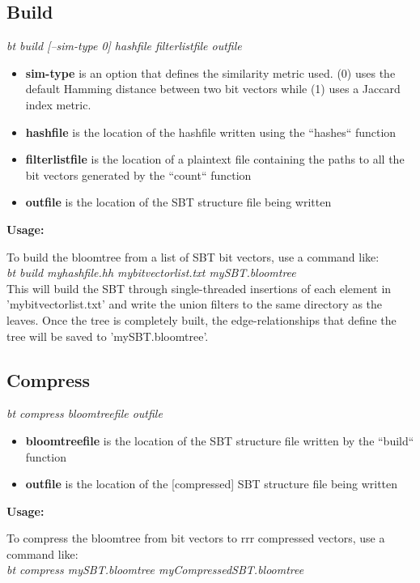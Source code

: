 \documentclass{article}
\begin{document}
\subsection{Build}
\textit{bt build [--sim-type 0] hashfile filterlistfile outfile}
\begin{itemize}
\item \textbf{sim-type} is an option that defines the similarity metric used. (0) uses the default Hamming distance between two bit vectors while (1) uses a Jaccard index metric.
\item \textbf{hashfile} is the location of the hashfile written using the ``hashes`` function
\item \textbf{filterlistfile} is the location of a plaintext file containing the paths to all the bit vectors generated by the ``count`` function
\item \textbf{outfile} is the location of the SBT structure file being written
\end{itemize}
\textbf{Usage:}

To build the bloomtree from a list of SBT bit vectors, use a command like: \\

\textit{bt build myhashfile.hh mybitvectorlist.txt mySBT.bloomtree} \\

This will build the SBT through single-threaded insertions of each element in 'mybitvectorlist.txt' and write the union filters to the same directory as the leaves. Once the tree is completely built, the edge-relationships that define the tree will be saved to 'mySBT.bloomtree'.

\subsection{Compress}
\textit{bt compress bloomtreefile outfile}
\begin{itemize}
\item \textbf{bloomtreefile} is the location of the SBT structure file written by the ``build`` function
\item \textbf{outfile} is the location of the [compressed] SBT structure file being written
\end{itemize}
\textbf{Usage:}

To compress the bloomtree from bit vectors to rrr compressed vectors, use a command like: \\

\textit{bt compress mySBT.bloomtree myCompressedSBT.bloomtree} \\
\end{document}
